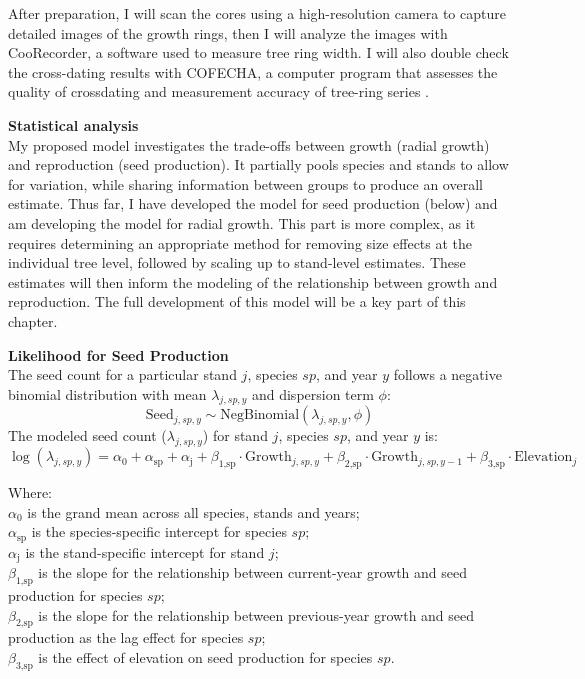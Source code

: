 \documentclass[11pt,letter]{article}
\begin{document}
After preparation, I will scan the cores using a high-resolution camera to capture detailed images of the growth rings, then I will analyze the images with CooRecorder, a software used to measure tree ring width. I will also double check the cross-dating results with COFECHA, a computer program that assesses the quality of crossdating and measurement accuracy of tree-ring series \citep{cook2013methods, speer2010fundamentals}.

\textbf{Statistical analysis}\\
My proposed model investigates the trade-offs between growth (radial growth) and reproduction (seed production). It partially pools species and stands to allow for variation, while sharing information between groups to produce an overall estimate. Thus far, I have developed the model for seed production (below) and am developing the model for radial growth. This part is more complex, as it requires determining an appropriate method for removing size effects at the individual tree level, followed by scaling up to stand-level estimates. These estimates will then inform the modeling of the relationship between growth and reproduction. The full development of this model will be a key part of this chapter.

\textbf{Likelihood for Seed Production}\\
The seed count for a particular stand \(j\), species \(sp\), and year \(y\) follows a negative binomial distribution with mean \(\lambda_{j,sp,y}\) and dispersion term \(\phi\):
\[
\text{Seed}_{j,sp,y} \sim \text{NegBinomial}(\lambda_{j,sp,y}, \phi)
\]
The modeled seed count (\(\lambda_{j,sp,y}\)) for stand \(j\), species \(sp\), and year \(y\) is:
\[
\log(\lambda_{j, sp, y}) =\alpha_{\text{0}} + \alpha_{\text{sp}} + \alpha_{\text{j}} + \beta_{\text{1,sp}} \cdot \text{Growth}_{j,sp,y} + \beta_{\text{2,sp}} \cdot \text{Growth}_{j,sp,y-1} + \beta_{\text{3,sp}} \cdot \text{Elevation}_{j}
\]

Where:\\
\(\alpha_{\text{0}}\) is the grand mean across all species, stands and years;\\
\(\alpha_{\text{sp}}\) is the species-specific intercept for species \(sp\);\\
\(\alpha_{\text{j}}\) is the stand-specific intercept for stand \(j\);\\
\(\beta_{\text{1,sp}}\) is the slope for the relationship between current-year growth and seed production for species \(sp\);\\
\(\beta_{\text{2,sp}}\) is the slope for the relationship between previous-year growth and seed production as the lag effect for species \(sp\);\\
\(\beta_{\text{3,sp}}\) is the effect of elevation on seed production for species \(sp\).
\end{document}
